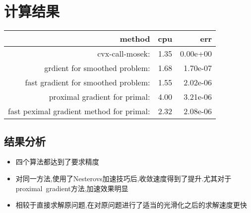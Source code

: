 \documentclass[UTF8]{ctexart}
\begin{document}
  \section{计算结果}
  \begin{tabular}{|r|r|r|}
\hline
method & cpu & err\\ \hline
  cvx-call-mosek:  & 1.35& 0.00e+00 \\
           grdient for smoothed problem: & 1.68 &1.70e-07 \\
     fast gradient for smoothed problem:  & 1.55 & 2.02e-06\\
      proximal gradient for primal:&  4.00 & 3.21e-06\\
fast peximal gradient method for primal: &  2.32& 2.08e-06 \\
\hline
\end{tabular}
\subsection{结果分析}

\begin{itemize}
  \item 四个算法都达到了要求精度
  \item 对同一方法,使用了Nesterovs加速技巧后,收敛速度得到了提升.尤其对于proximal\  gradient方法,加速效果明显
  \item 相较于直接求解原问题,在对原问题进行了适当的光滑化之后的求解速度更快
\end{itemize}

  
\end{document}
